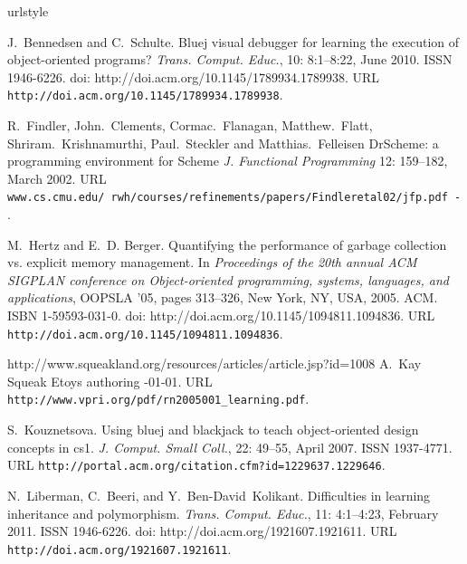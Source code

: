 \documentclass{sigplanconf}
\begin{document}
\begin{thebibliography}{}
\softraggedright

\providecommand{\natexlab}[1]{#1}
\providecommand{\url}[1]{\texttt{#1}}
\expandafter\ifx\csname urlstyle\endcsname\relax
  \providecommand{\doi}[1]{doi: #1}\else
  \providecommand{\doi}{doi: \begingroup \urlstyle{rm}\Url}\fi

J.~Bennedsen and C.~Schulte.
\newblock Bluej visual debugger for learning the execution of object-oriented
  programs?
\newblock \emph{Trans. Comput. Educ.}, 10: 8:1--8:22, June 2010.
\newblock ISSN 1946-6226.
\newblock \doi{http://doi.acm.org/10.1145/1789934.1789938}.
\newblock URL \url{http://doi.acm.org/10.1145/1789934.1789938}.

R.~Findler, John.~Clements, Cormac.~Flanagan, Matthew.~Flatt, Shriram.~Krishnamurthi, Paul.~Steckler and Matthias.~Felleisen
\newblock DrScheme: a programming environment for Scheme
\newblock \emph{J. Functional Programming} 12: 159–182, March 2002.
\newblock URL \url{www.cs.cmu.edu/~rwh/courses/refinements/papers/Findleretal02/jfp.pdf - }.

M.~Hertz and E.~D. Berger.
\newblock Quantifying the performance of garbage collection vs. explicit memory
  management.
\newblock In \emph{Proceedings of the 20th annual ACM SIGPLAN conference on
  Object-oriented programming, systems, languages, and applications}, OOPSLA
  '05, pages 313--326, New York, NY, USA, 2005. ACM.
\newblock ISBN 1-59593-031-0.
\newblock \doi{http://doi.acm.org/10.1145/1094811.1094836}.
\newblock URL \url{http://doi.acm.org/10.1145/1094811.1094836}.

http://www.squeakland.org/resources/articles/article.jsp?id=1008
A.~Kay
\newblock Squeak Etoys authoring
-01-01.
\newblock URL \url{http://www.vpri.org/pdf/rn2005001\_learning.pdf}.

S.~Kouznetsova.
\newblock Using bluej and blackjack to teach object-oriented design concepts in
  cs1.
\newblock \emph{J. Comput. Small Coll.}, 22: 49--55, April 2007.
\newblock ISSN 1937-4771.
\newblock URL \url{http://portal.acm.org/citation.cfm?id=1229637.1229646}.

N.~Liberman, C.~Beeri, and Y.~Ben-David~Kolikant.
\newblock Difficulties in learning inheritance and polymorphism.
\newblock \emph{Trans. Comput. Educ.}, 11: 4:1--4:23, February 2011.
\newblock ISSN 1946-6226.
\newblock \doi{http://doi.acm.org/1921607.1921611}.
\newblock URL \url{http://doi.acm.org/1921607.1921611}.


\end{thebibliography}
\end{document}

